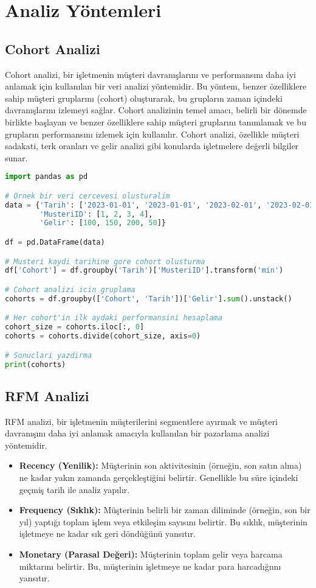 \section{Analiz Yöntemleri}
\subsection{Cohort Analizi}
Cohort analizi, bir işletmenin müşteri davranışlarını ve performansını daha iyi anlamak için kullanılan bir veri analizi yöntemidir. Bu yöntem, benzer özelliklere sahip müşteri gruplarını (cohort) oluşturarak, bu grupların zaman içindeki davranışlarını izlemeyi sağlar. Cohort analizinin temel amacı, belirli bir dönemde birlikte başlayan ve benzer özelliklere sahip müşteri gruplarını tanımlamak ve bu grupların performansını izlemek için kullanılır. Cohort analizi, özellikle müşteri sadakati, terk oranları ve gelir analizi gibi konularda işletmelere değerli bilgiler sunar.

\begin{lstlisting}[language=Python, caption=Cohort analizi örneği]
import pandas as pd

# Ornek bir veri cercevesi olusturalim
data = {'Tarih': ['2023-01-01', '2023-01-01', '2023-02-01', '2023-02-01'],
        'MusteriID': [1, 2, 3, 4],
        'Gelir': [100, 150, 200, 50]}

df = pd.DataFrame(data)

# Musteri kaydi tarihine gore cohort olusturma
df['Cohort'] = df.groupby('Tarih')['MusteriID'].transform('min')

# Cohort analizi icin gruplama
cohorts = df.groupby(['Cohort', 'Tarih'])['Gelir'].sum().unstack()

# Her cohort'in ilk aydaki performansini hesaplama
cohort_size = cohorts.iloc[:, 0]
cohorts = cohorts.divide(cohort_size, axis=0)

# Sonuclari yazdirma
print(cohorts)
\end{lstlisting}

\subsection{RFM Analizi}
RFM analizi, bir işletmenin müşterilerini segmentlere ayırmak ve müşteri davranışını daha iyi anlamak amacıyla kullanılan bir pazarlama analizi yöntemidir.

\begin{itemize}
    \item \textbf{Recency (Yenilik):} Müşterinin son aktivitesinin (örneğin, son satın alma) ne kadar yakın zamanda gerçekleştiğini belirtir. Genellikle bu süre içindeki geçmiş tarih ile analiz yapılır.
    \item \textbf{Frequency (Sıklık):} Müşterinin belirli bir zaman diliminde (örneğin, son bir yıl) yaptığı toplam işlem veya etkileşim sayısını belirtir. Bu sıklık, müşterinin işletmeye ne kadar sık geri döndüğünü yansıtır.
    \item \textbf{Monetary (Parasal Değeri):} Müşterinin toplam gelir veya harcama miktarını belirtir. Bu, müşterinin işletmeye ne kadar para harcadığıını yansıtır.
\end{itemize}

